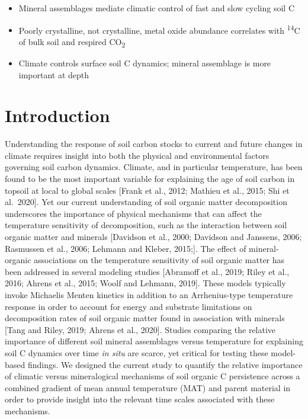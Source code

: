 \documentclass[english,man,floatsintext]{apa6}
\providecommand{\tightlist}{%
  \setlength{\itemsep}{0pt}\setlength{\parskip}{0pt}}
\begin{document}
\begin{itemize}
\tightlist
\item
  Mineral assemblages mediate climatic control of fast and slow cycling soil C
\item
  Poorly crystalline, not crystalline, metal oxide abundance correlates with \textsuperscript{14}C of bulk soil and respired CO\textsubscript{2}
\item
  Climate controls surface soil C dynamics; mineral assemblage is more important at depth
\end{itemize}

\hypertarget{introduction}{%
\section{Introduction}\label{introduction}}

Understanding the response of soil carbon stocks to current and future changes in climate requires insight into both the physical and environmental factors governing soil carbon dynamics. Climate, and in particular temperature, has been found to be the most important variable for explaining the age of soil carbon in topsoil at local to global scales {[}Frank et al., 2012; Mathieu et al., 2015; Shi et al.~2020{]}. Yet our current understanding of soil organic matter decomposition underscores the importance of physical mechanisms that can affect the temperature sensitivity of decomposition, such as the interaction between soil organic matter and minerals {[}Davidson et al., 2000; Davidson and Janssens, 2006; Rasmussen et al., 2006; Lehmann and Kleber, 2015;{]}. The effect of mineral-organic associations on the temperature sensitivity of soil organic matter has been addressed in several modeling studies {[}Abramoff et al., 2019; Riley et al., 2016; Ahrens et al., 2015; Woolf and Lehmann, 2019{]}. These models typically invoke Michaelis Menten kinetics in addition to an Arrhenius-type temperature response in order to account for energy and substrate limitations on decomposition rates of soil organic matter found in association with minerals {[}Tang and Riley, 2019; Ahrens et al., 2020{]}. Studies comparing the relative importance of different soil mineral assemblages versus temperature for explaining soil C dynamics over time \emph{in situ} are scarce, yet critical for testing these model-based findings. We designed the current study to quantify the relative importance of climatic versus mineralogical mechanisms of soil organic C persistence across a combined gradient of mean annual temperature (MAT) and parent material in order to provide insight into the relevant time scales associated with these mechanisms.
\end{document}
